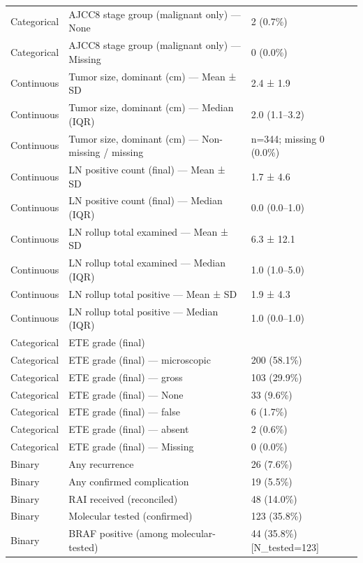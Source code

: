\begin{table}[htbp]
\begin{tabular}{lll}
Categorical & AJCC8 stage group (malignant only) — None & 2 (0.7\%) \\
Categorical & AJCC8 stage group (malignant only) — Missing & 0 (0.0\%) \\
Continuous & Tumor size, dominant (cm) — Mean ± SD & 2.4 ± 1.9 \\
Continuous & Tumor size, dominant (cm) — Median (IQR) & 2.0 (1.1–3.2) \\
Continuous & Tumor size, dominant (cm) — Non-missing / missing & n=344; missing 0 (0.0\%) \\
Continuous & LN positive count (final) — Mean ± SD & 1.7 ± 4.6 \\
Continuous & LN positive count (final) — Median (IQR) & 0.0 (0.0–1.0) \\
Continuous & LN rollup total examined — Mean ± SD & 6.3 ± 12.1 \\
Continuous & LN rollup total examined — Median (IQR) & 1.0 (1.0–5.0) \\
Continuous & LN rollup total positive — Mean ± SD & 1.9 ± 4.3 \\
Continuous & LN rollup total positive — Median (IQR) & 1.0 (0.0–1.0) \\
Categorical & ETE grade (final) &  \\
Categorical & ETE grade (final) — microscopic & 200 (58.1\%) \\
Categorical & ETE grade (final) — gross & 103 (29.9\%) \\
Categorical & ETE grade (final) — None & 33 (9.6\%) \\
Categorical & ETE grade (final) — false & 6 (1.7\%) \\
Categorical & ETE grade (final) — absent & 2 (0.6\%) \\
Categorical & ETE grade (final) — Missing & 0 (0.0\%) \\
Binary & Any recurrence & 26 (7.6\%) \\
Binary & Any confirmed complication & 19 (5.5\%) \\
Binary & RAI received (reconciled) & 48 (14.0\%) \\
Binary & Molecular tested (confirmed) & 123 (35.8\%) \\
Binary & BRAF positive (among molecular-tested) & 44 (35.8\%) [N\_tested=123] \\
\bottomrule
\end{tabular}
\end{table}
